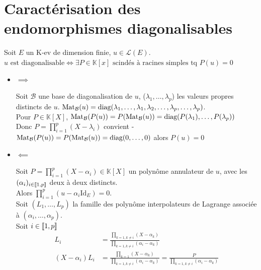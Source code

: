 \documentclass[]{article}
\begin{document}
\section{Caractérisation des endomorphismes diagonalisables}

Soit $E$ un K-ev de dimension finie, $u \in \mathcal{L}(E)$. \\

\underline{$ u \text{ est diagonalisable} \iff \exists P \in \mathbb{K}[x] \text{ scindés à racines simples tq } P(u) = 0 $} \\

\begin{itemize}
    \item $\boxed{\implies}$
    
    Soit $\mathcal{B}$ une base de diagonalisation de $u$, ($\lambda_1, \dots, \lambda_p$) les valeurs propres distincts de $u$. $\text{Mat}_{\mathcal{B}}(u) = \text{diag}(\lambda_1, \dots, \lambda_1, \lambda_2, \dots, \lambda_p, \dots, \lambda_p)$. \\

    Pour $P \in \mathbb{K}[X]$, $\text{Mat}_{\mathcal{B}}(P(u)) = P(\text{Mat}_{\mathcal{B}}(u)) = \text{diag}(P(\lambda_1), \dots, P(\lambda_p))$\\

    Donc $P = \prod_{i=1}^{p} (X-\lambda_i)$ convient - $\text{Mat}_{\mathcal{B}}(P(u)) = P(\text{Mat}_{\mathcal{B}}(u)) = \text{diag}(0, \dots, 0)$ alors $P(u) = 0$

    \item $\boxed{\impliedby}$
    
    Soit $P = \prod_{i=1}^p(X-\alpha_i) \in \mathbb{K}[X]$ un polynôme annulateur de $u$, avec les $(\alpha_i)_{i \in \llbracket {1}, {p} \rrbracket}$ deux à deux distincts. \\
    
    Alors $\prod_{i=1}^p(u-\alpha_i \text{Id}_E) = 0$. \\

    Soit $(L_1, \dots, L_p)$ la famille des polynôme interpolateurs de Lagrange associée à $(\alpha_i, \dots, \alpha_p)$. \\

    Soit $i \in \llbracket {1}, {p} \rrbracket$
    \begin{align*}
        L_i &= \frac{\prod_{k=1, k \neq i}(X - \alpha_k)}{\prod_{k=1, k \neq i}(\alpha_i - \alpha_k)} \\
        (X-\alpha_i)L_i &= \frac{\prod_{k=1}(X - \alpha_k)}{\prod_{k=1, k \neq i}(\alpha_i - \alpha_k)} = \frac{P}{\prod_{k=1, k \neq i}(\alpha_i - \alpha_k)}
    \end{align*}


\end{itemize}
\end{document}
